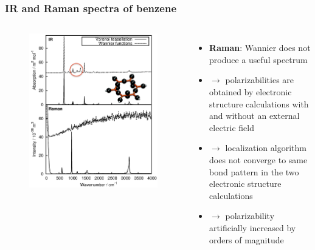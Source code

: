\documentclass[t]{beamer}
\begin{document}
	\begin{frame}
	    \frametitle{IR and Raman spectra of benzene}
	    \vspace{-.6cm}
	    \begin{columns}
	    \begin{figure}
	    \vspace{-.6cm}
            \includegraphics[width=1.1\textwidth]{figures/benzene_spectra2.png}
        \end{figure}
        \begin{itemize}
            \item \textbf{Raman}: Wannier does not produce a useful spectrum
            \item[]
            $\rightarrow$ polarizabilities are obtained by electronic structure calculations with and without an external electric field
            \item[]
            $\rightarrow$ localization algorithm does not converge to same bond pattern in the two electronic structure calculations
            \item[]
            $\rightarrow$ polarizability artificially increased by orders of magnitude 
        \end{itemize}
        \end{columns}
	\end{frame}
\end{document}
